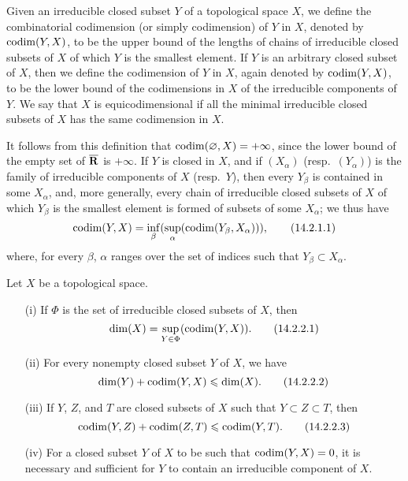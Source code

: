 \begin{definition}[14.2.1]
\label{0.14.2.1}
Given an irreducible closed subset $Y$ of a topological space $X$, we define the combinatorial codimension (or simply codimension) of $Y$ in $X$, denoted by $\operatorname{codim}(Y,X)$, to be the upper bound of the lengths of chains of irreducible closed subsets of $X$ of which $Y$ is the smallest element.
If $Y$ is an arbitrary closed subset of $X$, then we define the codimension of $Y$ in $X$, again denoted by $\operatorname{codim}(Y,X)$, to be the lower bound of the codimensions in $X$ of the irreducible components of $Y$.
We say that $X$ is equicodimensional if all the minimal irreducible closed subsets of $X$ has the same codimension in $X$.
\end{definition}

It follows from this definition that $\operatorname{codim}(\varnothing,X)=+\infty$, since the lower bound of the empty set of $\overline{\mathbf{R}}$ is $+\infty$.
If $Y$ is closed in $X$, and if $(X_\alpha)$ (resp.~$(Y_\alpha)$) is the family of irreducible components of $X$ (resp.~$Y$), then every $Y_\beta$ is contained in some $X_\alpha$, and, more generally, every chain of irreducible closed subsets of $X$ of which $Y_\beta$ is the smallest element is formed of subsets of some $X_\alpha$; we thus have
\[
\label{0.14.2.1.1}
  \operatorname{codim}(Y,X)=\inf_\beta(\sup_\alpha(\operatorname{codim}(Y_\beta,X_\alpha))),
  \tag{14.2.1.1}
\]
where, for every $\beta$, $\alpha$ ranges over the set of indices such that $Y_\beta\subset X_\alpha$.

\begin{proposition}[14.2.2]
\label{0.14.2.2}
Let $X$ be a topological space.
\begin{enumerate}
  \item[{\rm(i)}] If $\Phi$ is the set of irreducible closed subsets of $X$, then
    \[
    \label{0.14.2.2.1}
      \dim(X)=\sup_{Y\in\Phi}(\operatorname{codim}(Y,X)).
      \tag{14.2.2.1}
    \]
  \item[{\rm(ii)}] For every nonempty closed subset $Y$ of $X$, we have
    \[
    \label{0.14.2.2.2}
      \dim(Y)+\operatorname{codim}(Y,X)\leqslant\dim(X).
      \tag{14.2.2.2}
    \]
  \item[{\rm(iii)}] If $Y$, $Z$, and $T$ are closed subsets of $X$ such that $Y\subset Z\subset T$, then
    \[
    \label{0.14.2.2.3}
      \operatorname{codim}(Y,Z)+\operatorname{codim}(Z,T)\leqslant\operatorname{codim}(Y,T).
       \tag{14.2.2.3}
    \]
  \item[{\rm(iv)}] For a closed subset $Y$ of $X$ to be such that $\operatorname{codim}(Y,X)=0$, it is necessary and sufficient for $Y$ to contain an irreducible component of $X$.
\end{enumerate}
\end{proposition}

